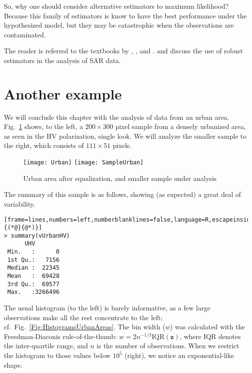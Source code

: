 So, why one should consider alternative estimators to maximum likelihood?
Because this family of estimators is know to have the best performance under the hypothesized model, but they may be catastrophic when the observations are contaminated.

The reader is referred to the textbooks by
\citet{Huber81},
\citet{RobustStatisticsHuberRonchetti}, and
\citet{MaronnaMartinYohai:book:2006}.
\citet{BustosFreryLucini:Mestimators:2001} and \citet{AllendeFreryetal:JSCS:05} discuss the use of robust estimators in the analysis of SAR data.

\section{Another example}

We will conclude this chapter with the analysis of data from an urban area.
Fig.~\ref{Image:UrbanArea} shows, to the left, a $200\times 300$ pixel sample from a densely urbanized area, as seen in the HV polarization, single look.
We will analyze the smaller sample to the right, which consists of $111\times 51$ pixels.

\begin{figure}[hbt]
\centering
\texttt{[image: Urban]}\quad
\texttt{[image: SampleUrban]}
\caption{Urban area after equalization, and smaller sample under analysis}\label{Image:UrbanArea}
\end{figure}

The summary of this sample is as follows, showing (as expected) a great deal of variability.
\begin{lstlisting}[frame=lines,numbers=left,numberblanklines=false,language=R,escapeinside={(*@}{@*)}]
> summary(vUrbanHV)
      UHV         
 Min.   :      0  
 1st Qu.:   7156  
 Median :  22345  
 Mean   :  69428  
 3rd Qu.:  69577  
 Max.   :3266496  
\end{lstlisting}

The usual histogram (to the left) is barely informative, as a few large observations make all the rest concentrate to the left; cf.\ Fig.~\ref{Fig:HistogramsUrbanAreas}.
The bin width ($w$) was calculated with the Freedman-Diaconis rule-of-the-thumb: $w=2n^{-1/3}\text{IQR}(\bm z)$, where $\text{IQR}$ denotes the inter-quartile range, and $n$ is the number of observations\cite{OntheHistogramAsaDensityEstimatorL2Theory1981}.
When we restrict the histogram to those values below $10^5$ (right), we notice an exponential-like shape.

